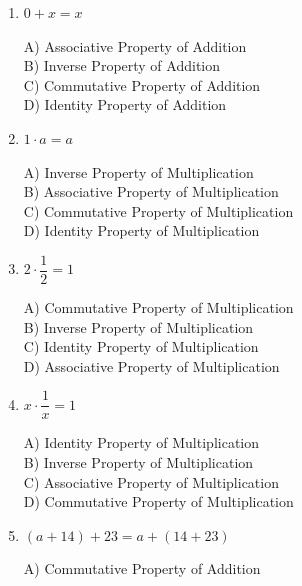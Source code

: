 \documentclass[11pt]{article}
\begin{document}
\begin{enumerate}
  \vspace{0.3cm}
  \item $0 + x = x$
\\[2pt]
\begin{minipage}{\linewidth}
A) Associative Property of Addition \\
B) Inverse Property of Addition \\
C) Commutative Property of Addition \\
D) Identity Property of Addition
\end{minipage}
  \vspace{0.3cm}
  \item $1 \cdot a = a$
\\[2pt]
\begin{minipage}{\linewidth}
A) Inverse Property of Multiplication \\
B) Associative Property of Multiplication \\
C) Commutative Property of Multiplication \\
D) Identity Property of Multiplication
\end{minipage}
  \vspace{0.3cm}
  \item $2 \cdot \dfrac{1}{2} = 1$
\\[2pt]
\begin{minipage}{\linewidth}
A) Commutative Property of Multiplication \\
B) Inverse Property of Multiplication \\
C) Identity Property of Multiplication \\
D) Associative Property of Multiplication
\end{minipage}
  \vspace{0.3cm}
  \item $x \cdot \dfrac{1}{x} = 1$
\\[2pt]
\begin{minipage}{\linewidth}
A) Identity Property of Multiplication \\
B) Inverse Property of Multiplication \\
C) Associative Property of Multiplication \\
D) Commutative Property of Multiplication
\end{minipage}
  \vspace{0.3cm}
  \item $(a + 14) + 23 = a + (14 + 23)$
\\[2pt]
\begin{minipage}{\linewidth}
A) Commutative Property of Addition \\

\end{minipage}
\end{enumerate}
\end{document}

